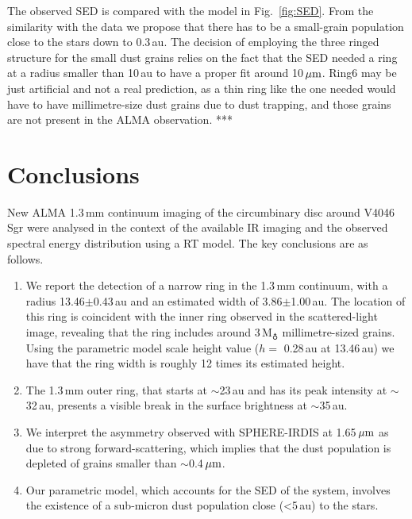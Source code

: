 \documentclass[letters,usenatbib,times]{mnras}
\begin{document}
The observed SED is compared with the model in Fig.~\ref{fig:SED}. From the similarity with the data we propose that there has to be a small-grain population close to the stars down to 0.3\,au. The decision of employing the three ringed structure for the small dust grains relies on the fact that the SED needed a ring at a radius smaller than 10\,au to have a proper fit around 10\,$\hbox{$\mu$m}$.
Ring6 may be just artificial and not a real prediction, as a thin ring like the one needed would have to have millimetre-size dust grains due to dust trapping, and those grains are not present in the ALMA observation. *** 

\section{Conclusions} \label{sec:Conclusions}

New ALMA 1.3\,mm continuum imaging of the circumbinary disc around V4046\,Sgr were analysed in the context of the available IR imaging and the observed spectral energy distribution using a RT model. The key conclusions are as follows.
\begin{enumerate}
  \item We report the detection of a narrow ring in the 1.3\,mm continuum, with a radius 13.46$\pm$0.43\,au and an estimated width of 3.86$\pm$1.00\,au. The location of this ring is coincident with the inner ring observed in the scattered-light image, revealing that the ring includes around 3\,M$_{\earth}$ millimetre-sized grains. Using the parametric model scale height value ($h= $ 0.28\,au at 13.46\,au) we have that the ring width is roughly 12 times its estimated height.
  
  \item The 1.3\,mm outer ring, that starts at $\sim$23\,au and has its peak intensity at $\sim$32\,au, presents a visible break in the surface brightness at $\sim$35\,au. 
  
  \item We interpret the asymmetry observed with SPHERE-IRDIS at 1.65\,$\hbox{$\mu$m}$ as due to strong forward-scattering, which implies that the dust population is depleted of grains smaller than $\sim$0.4\,$\hbox{$\mu$m}$.
  
  \item Our parametric model, which accounts for the SED of the system, involves the existence of a sub-micron dust population close (<5\,au) to the stars. 
\end{enumerate}
\end{document}
